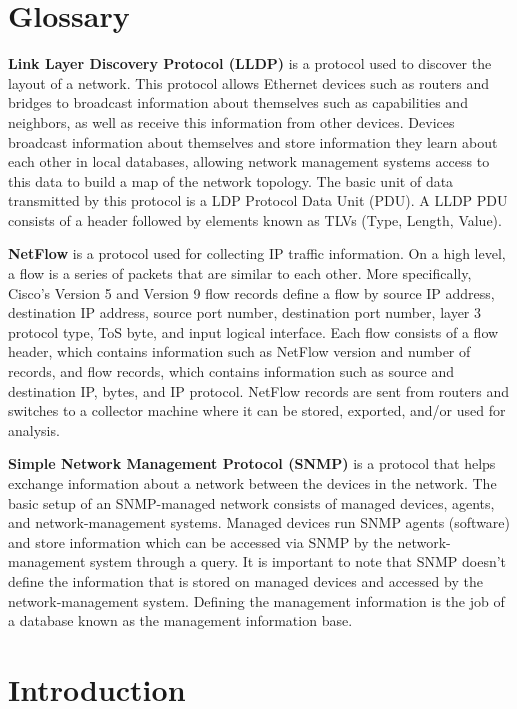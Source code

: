 \documentclass{sig-alternate}
\begin{document}
\section*{Glossary}

\textbf{Link Layer Discovery Protocol (LLDP)} is a protocol used to discover the
layout of a network.\cite{ExtremeNetLldp} This protocol allows Ethernet devices
such as routers and bridges to broadcast information about themselves such as
capabilities and neighbors, as well as receive this information from other
devices. Devices broadcast information about themselves and store information
they learn about each other in local databases, allowing network management
systems access to this data to build a map of the network topology. The basic
unit of data transmitted by this protocol is a LDP Protocol Data Unit (PDU). A
LLDP PDU consists of a header followed by elements known as TLVs (Type, Length,
Value).

\textbf{NetFlow} is a protocol used for collecting IP traffic
information.\cite{SolarWindsGuide} On a high level, a flow is a series of
packets that are similar to each other. More specifically, Cisco's Version 5 and
Version 9 flow records define a flow by source IP address, destination IP
address, source port number, destination port number, layer 3 protocol type, ToS
byte, and input logical interface. Each flow consists of a flow header, which
contains information such as NetFlow version and number of records, and flow
records, which contains information such as source and destination IP, bytes,
and IP protocol. NetFlow records are sent from routers and switches to a
collector machine where it can be stored, exported, and/or used for analysis.

\textbf{Simple Network Management Protocol (SNMP)} is a protocol that helps
exchange information about a network between the devices in the
network.\cite{ZohoSnmp} The basic setup of an SNMP-managed network consists of
managed devices, agents, and network-management systems. Managed devices run
SNMP agents (software) and store information which can be accessed via SNMP by
the network-management system through a query. It is important to note that SNMP
doesn't define the information that is stored on managed devices and accessed by
the network-management system. Defining the management information is the job of
a database known as the management information base.

\section{Introduction}
\end{document}
